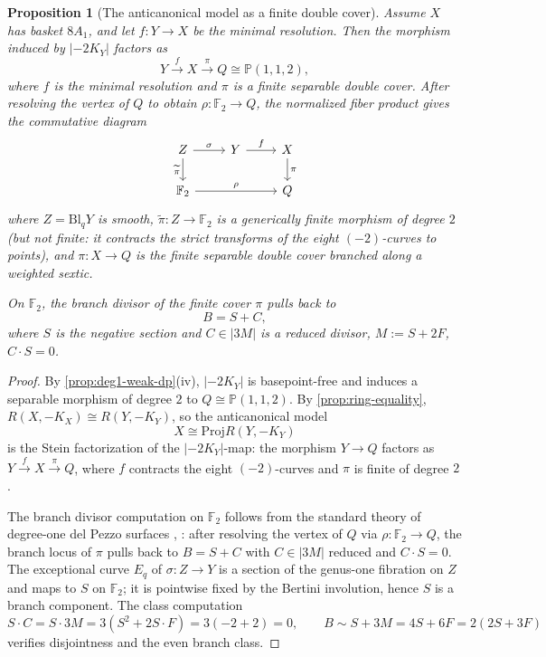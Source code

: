 \documentclass[11pt]{article}
\newtheorem{proposition}[proposition]{Proposition}
\theoremstyle{definition}
\newcommand{\Pbb}{\mathbb P}
\newcommand{\Bl}{\mathrm{Bl}}
\newcommand{\Proj}{\mathrm{Proj}}
\begin{document}
\begin{proposition}[The anticanonical model as a finite double cover]\label{prop:branch-model}
Assume $X$ has basket $8A_1$, and let $f\colon Y\to X$ be the minimal resolution. Then the morphism induced by $|-2K_Y|$ factors as
\[
Y\xrightarrow{f} X \xrightarrow{\pi} Q\cong \Pbb(1,1,2),
\]
where $f$ is the minimal resolution and $\pi$ is a finite separable double cover. After resolving the vertex of $Q$ to obtain $\rho\colon \mathbb F_2\to Q$, the normalized fiber product gives the commutative diagram
\[
\begin{tikzcd}
Z \ar[r,"\sigma"] \ar[d,"\widetilde\pi"'] & Y \ar[r,"f"] & X \ar[d,"\pi"] \\
\mathbb F_2 \ar[rr,"\rho"] & & Q
\end{tikzcd}
\]
where $Z=\Bl_qY$ is smooth, $\widetilde\pi\colon Z\to \mathbb F_2$ is a generically finite morphism of degree $2$ (but not finite: it contracts the strict transforms of the eight $(-2)$-curves to points), and $\pi\colon X\to Q$ is the finite separable double cover branched along a weighted sextic.

On $\mathbb F_2$, the branch divisor of the finite cover $\pi$ pulls back to
\[
B=S+C,
\]
where $S$ is the negative section and $C\in |3M|$ is a reduced divisor, $M:=S+2F$, $C\cdot S=0$.
\end{proposition}

\begin{proof}
By \cref{prop:deg1-weak-dp}(iv), $|-2K_Y|$ is basepoint-free and induces a separable morphism of degree $2$ to $Q\cong\Pbb(1,1,2)$. By \cref{prop:ring-equality}, $R(X,-K_X)\cong R(Y,-K_Y)$, so the anticanonical model
\[
X\cong \Proj R(Y,-K_Y)
\]
is the Stein factorization of the $|-2K_Y|$-map: the morphism $Y\to Q$ factors as $Y\xrightarrow{f} X\xrightarrow{\pi} Q$, where $f$ contracts the eight $(-2)$-curves and $\pi$ is finite of degree $2$.

The branch divisor computation on $\mathbb F_2$ follows from the standard theory of degree-one del Pezzo surfaces \cite[Prop.~2.2]{AscherBejleri21}, \cite{HW81}: after resolving the vertex of $Q$ via $\rho\colon\mathbb F_2\to Q$, the branch locus of $\pi$ pulls back to $B=S+C$ with $C\in |3M|$ reduced and $C\cdot S=0$. The exceptional curve $E_q$ of $\sigma\colon Z\to Y$ is a section of the genus-one fibration on $Z$ and maps to $S$ on $\mathbb F_2$; it is pointwise fixed by the Bertini involution, hence $S$ is a branch component. The class computation
\[
S\cdot C = S\cdot 3M = 3(S^2+2S\cdot F)=3(-2+2)=0,
\qquad
B\sim S+3M=4S+6F=2(2S+3F)
\]
verifies disjointness and the even branch class.
\end{proof}
\end{document}
